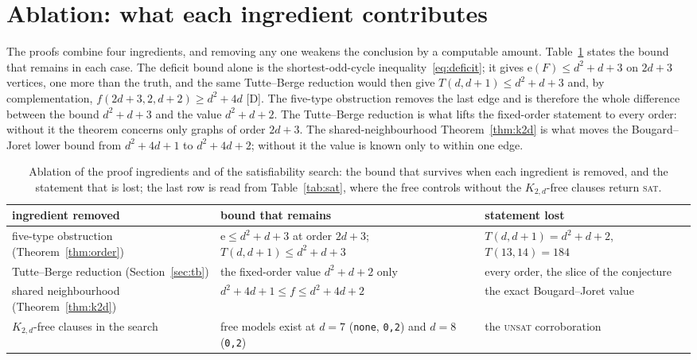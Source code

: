 \documentclass[11pt]{article}
\theoremstyle{remark}
\newcommand{\e}{\mathrm{e}}
\begin{document}
\section{Ablation: what each ingredient contributes}\label{sec:ablation}

The proofs combine four ingredients, and removing any one weakens the conclusion by a computable amount. Table~\ref{tab:ablation} states the bound that remains in each case. The deficit bound alone is the shortest-odd-cycle inequality~\eqref{eq:deficit}; it gives $\e(F)\le d^2+d+3$ on $2d+3$ vertices, one more than the truth, and the same Tutte--Berge reduction would then give $T(d,d+1)\le d^2+d+3$ and, by complementation, $f(2d+3,2,d+2)\ge d^2+4d$ [D]. The five-type obstruction removes the last edge and is therefore the whole difference between the bound $d^2+d+3$ and the value $d^2+d+2$. The Tutte--Berge reduction is what lifts the fixed-order statement to every order: without it the theorem concerns only graphs of order $2d+3$. The shared-neighbourhood Theorem~\ref{thm:k2d} is what moves the Bougard--Joret lower bound from $d^2+4d+1$ to $d^2+4d+2$; without it the value is known only to within one edge.

\begin{table}[ht]
\centering\small
\begin{tabular}{>{\raggedright\arraybackslash}p{}>{\raggedright\arraybackslash}p{}>{\raggedright\arraybackslash}p{}}
\toprule
ingredient removed & bound that remains & statement lost \\
\midrule
five-type obstruction (Theorem~\ref{thm:order}) & $\e\le d^2+d+3$ at order $2d+3$; $T(d,d+1)\le d^2+d+3$ & $T(d,d+1)=d^2+d+2$, $T(13,14)=184$ \\
Tutte--Berge reduction (Section~\ref{sec:tb}) & the fixed-order value $d^2+d+2$ only & every order, the slice of the conjecture \\
shared neighbourhood (Theorem~\ref{thm:k2d}) & $d^2+4d+1\le f\le d^2+4d+2$ & the exact Bougard--Joret value \\
$K_{2,d}$-free clauses in the search & free models exist at $d=7$ (\texttt{none}, \texttt{0,2}) and $d=8$ (\texttt{0,2}) & the \textsc{unsat} corroboration \\
\bottomrule
\end{tabular}
\caption{Ablation of the proof ingredients and of the satisfiability search: the bound that survives when each ingredient is removed, and the statement that is lost; the last row is read from Table~\ref{tab:sat}, where the free controls without the $K_{2,d}$-free clauses return \textsc{sat}.}
\label{tab:ablation}
\end{table}
\end{document}
